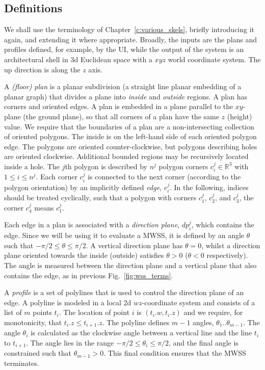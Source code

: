 \subsection {Definitions}
\label{sec:method}

We shall use the terminology of Chapter~\ref{c:various_skels}, briefly introducing it again, and extending it where appropriate. Broadly, the inputs are the plans and profiles defined, for example, by the UI, while the output of the system is an architectural shell in 3d Euclidean space with a $xyz$ world coordinate system. The up direction is along the $z$ axis. 

A \emph{(floor) plan} is a  planar subdivision (a straight line planar embedding of a planar graph) that divides a plane into \emph{inside} and \emph{outside} regions. 
A plan has corners and oriented edges. 
A plan is embedded in a plane parallel to the $xy$-plane (the ground plane), so that all corners of a plan have the same $z$ (height) value. 
We require that the boundaries of a plan are a non-intersecting collection of oriented polygons. 
The inside is on the left-hand side of each oriented polygon edge. 
The polygons are oriented counter-clockwise, but polygons describing holes are oriented clockwise. Additional bounded regions may be recursively located inside a hole.
The $j$th polygon is described by $n^j$ polygon corners $c^j_i \in \mathbb{R}^3$ with $1 \leq i \leq n^j$.  Each corner $c^j_i$ is connected to the next corner (according to the polygon orientation) by an implicitly defined \emph{edge}, $e^j_i$. 
In the following, indices should be treated cyclically, such that a polygon with corners $c^j_1$, $c^j_2$, and $c^j_3$, the corner $c^j_4$ means $c^j_1$.

Each edge in a plan is associated with a \emph{direction plane}, $dp^j_i$, which contains the edge. Since we will be using it to evaluate a MWSS, it is defined by an angle $\theta$ such that $-\pi/2 \leq \theta \leq \pi/2$. 
A vertical direction plane has $\theta = 0$, whilst a direction plane oriented towards the inside (outside) satisfies  $\theta > 0$ ($\theta < 0$ respectively). The angle is measured between the direction plane and a vertical plane that also contains the edge, as in previous Fig.~\ref{fig:wss_terms}.

A \emph{profile} is a set of polylines that is used to control the direction plane of an edge. A polyline is modeled in a local 2d  $wz$-coordinate system and consists of a list of $m$ points $t_i$. The location of point $i$ is $(t_i.w,t_i.z)$ and we require, for monotonicity, that $t_i.z \leq t_{i+1}.z$. The polyline defines $m-1$ angles, $\theta_1..\theta_{m-1}$. The angle $\theta_i$ is calculated as the clockwise angle between a vertical line and the line $t_i$ to $t_{i+1}$. The angle lies in the range $-\pi/2 \leq \theta_i \leq \pi/2$, and the final angle is constrained such that $\theta_{m-1} > 0$. This final condition ensures that the MWSS terminates.

